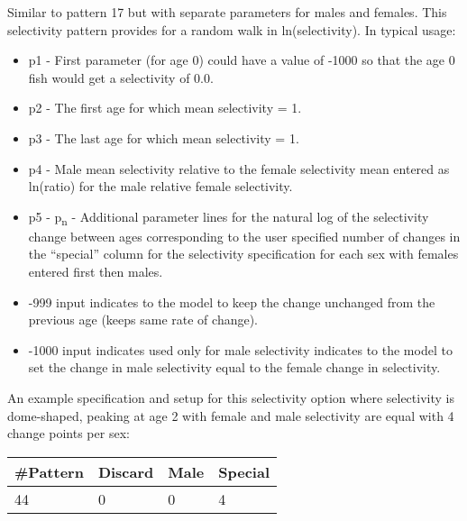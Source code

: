 Similar to pattern 17 but with separate parameters for males and females. This selectivity pattern provides for a random walk in ln(selectivity). In typical usage:
	\begin{itemize}
		\item p1 - First parameter (for age 0) could have a value of -1000 so that the age 0 fish would get a selectivity of 0.0.
		\item p2 - The first age for which mean selectivity = 1.
		\item p3 - The last age for which mean selectivity = 1.
		\item p4 - Male mean selectivity relative to the female selectivity mean entered as ln(ratio) for the male relative female selectivity.
		\item p5 - p\textsubscript{n} - Additional parameter lines for the natural log of the selectivity change between ages corresponding to the user specified number of changes in the ``special'' column for the selectivity specification for each sex with females entered first then males.
		\item -999 input indicates to the model to keep the change unchanged from the previous age (keeps same rate of change).
		\item -1000 input indicates used only for male selectivity indicates to the model to set the change in male selectivity equal to the female change in selectivity.
	\end{itemize}
	
An example specification and setup for this selectivity option where selectivity is dome-shaped, peaking at age 2 with female and male selectivity are equal with 4 change points per sex:
	\begin{center}
		\begin{longtable}{p{1.5cm} p{1.5cm} p{1.5cm} p{1.5cm}}
			\hline
			\#Pattern & Discard & Male & Special \Tstrut\Bstrut\\
			\hline
			44 & 0 & 0 & 4 \Tstrut\Bstrut\\
			\hline
		\end{longtable}
	\end{center}

